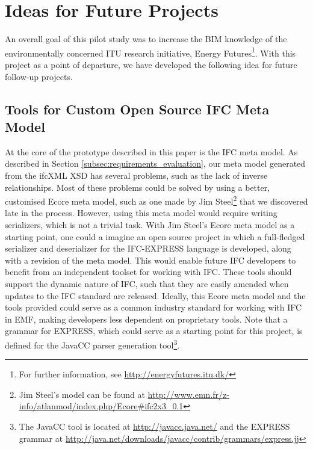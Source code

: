 
\section{Ideas for Future Projects}
\label{sec:plan_for_future_projects}
An overall goal of this pilot study was to increase the BIM knowledge of the environmentally concerned ITU research initiative, Energy Futures\footnote{For further information, see \url{http://energyfutures.itu.dk/}}. With this project as a point of departure, we have developed the following idea for future follow-up projects.

\subsection{Tools for Custom Open Source IFC Meta Model}
At the core of the prototype described in this paper is the IFC meta model. As described in Section \ref{subsec:requirements_evaluation}, our meta model generated from the ifcXML XSD has several problems, such as the lack of inverse relationships. Most of these problems could be solved by using a better, customised Ecore meta model, such as one made by Jim Steel\footnote{Jim Steel's model can be found at \url{http://www.emn.fr/z-info/atlanmod/index.php/Ecore#ifc2x3_0.1}} that we discovered late in the process. However, using this meta model would require writing serializers, which is not a trivial task. With Jim Steel's Ecore meta model as a starting point, one could a imagine an open source project in which a full-fledged serializer and deserializer for the IFC-EXPRESS language is developed, along with a revision of the meta model. This would enable future IFC developers to benefit from an independent toolset for working with IFC. These tools should support the dynamic nature of IFC, such that they are easily amended when updates to the IFC standard are released. Ideally, this Ecore meta model and the tools provided could serve as a common industry standard for working with IFC in EMF, making developers less dependent on proprietary tools. Note that a grammar for EXPRESS, which could serve as a starting point for this project, is defined for the JavaCC parser generation tool\footnote{The JavaCC tool is located at \url{http://javacc.java.net/} and the EXPRESS grammar at \url{http://java.net/downloads/javacc/contrib/grammars/express.jj}}.

